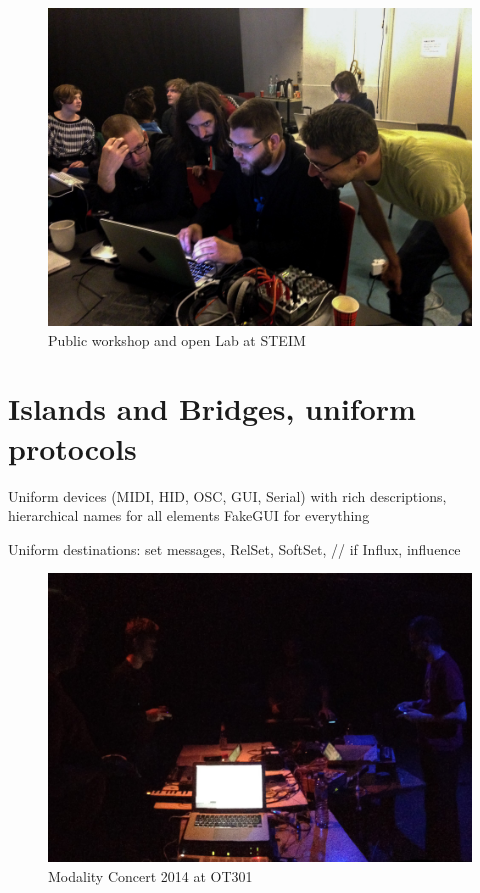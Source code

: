 \documentclass{article}
\begin{document}
\begin{figure}[h]
	\centering
		\includegraphics[width=.9\columnwidth]{../media/20140403-IMG_1667.jpg}
	\caption{Public workshop and open Lab at STEIM}
	\label{fig:media_20140331-IMG_5976}
\end{figure}

\section{Islands and Bridges, uniform protocols}
\label{sec:islands_and_bridges_uniform_protocols}

Uniform devices (MIDI, HID, OSC, GUI, Serial)
		with rich descriptions, hierarchical names for all elements
		FakeGUI for everything


	
	Uniform destinations:
		set messages, RelSet, SoftSet, // if Influx, influence
		
\begin{figure}[h]
	\centering
		\includegraphics[width=.9\columnwidth]{../media/20140405-IMG_1691.jpg}
	\caption{Modality Concert 2014 at OT301}
	\label{fig:media_20140405-IMG_1691}
\end{figure}
\end{document}
